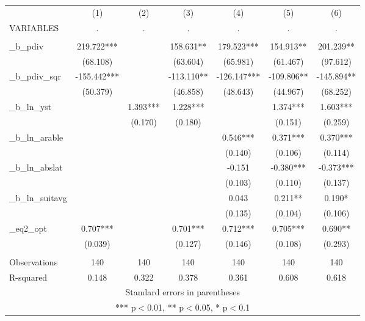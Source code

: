 \documentclass[]{article}
\begin{document}
\begin{tabular}{lcccccc} \hline
 & (1) & (2) & (3) & (4) & (5) & (6) \\
VARIABLES & . & . & . & . & . & . \\ \hline
 &  &  &  &  &  &  \\
\_b\_pdiv & 219.722*** &  & 158.631** & 179.523*** & 154.913** & 201.239** \\
 & (68.108) &  & (63.604) & (65.981) & (61.467) & (97.612) \\
\_b\_pdiv\_sqr & -155.442*** &  & -113.110** & -126.147*** & -109.806** & -145.894** \\
 & (50.379) &  & (46.858) & (48.643) & (44.967) & (68.252) \\
\_b\_ln\_yst &  & 1.393*** & 1.228*** &  & 1.374*** & 1.603*** \\
 &  & (0.170) & (0.180) &  & (0.151) & (0.259) \\
\_b\_ln\_arable &  &  &  & 0.546*** & 0.371*** & 0.370*** \\
 &  &  &  & (0.140) & (0.106) & (0.114) \\
\_b\_ln\_abslat &  &  &  & -0.151 & -0.380*** & -0.373*** \\
 &  &  &  & (0.103) & (0.110) & (0.137) \\
\_b\_ln\_suitavg &  &  &  & 0.043 & 0.211** & 0.190* \\
 &  &  &  & (0.135) & (0.104) & (0.106) \\
\_eq2\_opt & 0.707*** &  & 0.701*** & 0.712*** & 0.705*** & 0.690** \\
 & (0.039) &  & (0.127) & (0.146) & (0.108) & (0.293) \\
 &  &  &  &  &  &  \\
Observations & 140 & 140 & 140 & 140 & 140 & 140 \\
 R-squared & 0.148 & 0.322 & 0.378 & 0.361 & 0.608 & 0.618 \\ \hline
\multicolumn{7}{c}{ Standard errors in parentheses} \\
\multicolumn{7}{c}{ *** p$<$0.01, ** p$<$0.05, * p$<$0.1} \\
\end{tabular}
\end{document}
